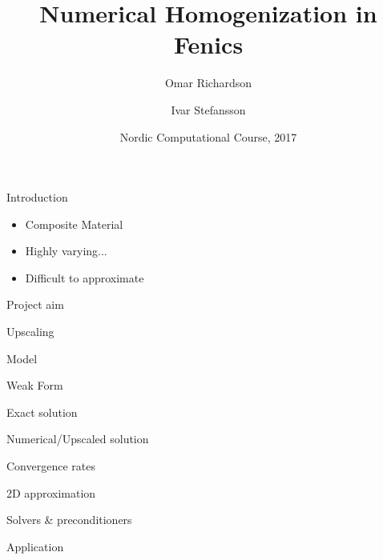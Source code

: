 \documentclass{beamer}
\title[Numerical homogenization]{Numerical Homogenization in Fenics}
\author[O. Richardson \and I. Stefansson] %
{Omar Richardson \and Ivar Stefansson}
\institute %
{
    Karlstad University, Sweden \and University of Bergen, Norway
}
\date[]{Nordic Computational Course, 2017}
\begin{document}
  \frame{\titlepage}
\begin{frame}{Introduction}
  \begin{itemize}
    \item Composite Material
    \item Highly varying...
    \item Difficult to approximate
  \end{itemize}
\end{frame}

\begin{frame}[t]{Project aim}

\end{frame}

\begin{frame}[t]{Upscaling}

\end{frame}

\begin{frame}[t]{Model}

\end{frame}

\begin{frame}[t]{Weak Form}

\end{frame}

\begin{frame}[t]{Exact solution}

\end{frame}

\begin{frame}[t]{Numerical/Upscaled solution}

\end{frame}

\begin{frame}[t]{Convergence rates}

\end{frame}

\begin{frame}[t]{2D approximation}

\end{frame}

\begin{frame}[t]{Solvers \& preconditioners}

\end{frame}

\begin{frame}[t]{Application}

\end{frame}
\end{document}
